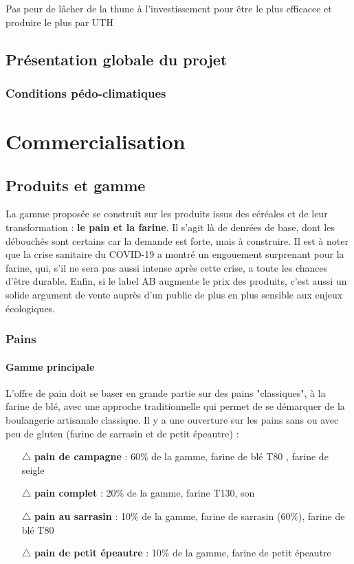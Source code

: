 \documentclass{book}
\begin{document}
Pas peur de lâcher de la thune à l'investissement pour être le plus efficacee et produire le plus par UTH

\section{Présentation globale du projet}

\subsection{Conditions pédo-climatiques}

\chapter{Commercialisation}

\section{Produits et gamme}

La gamme proposée se construit sur les produits issus des céréales et de leur transformation : \textbf{le pain et la farine}. Il s'agit là de denrées de base, dont les débouchés sont certains car la demande est forte, mais à construire. Il est à noter que la crise sanitaire du COVID-19 a montré un engouement surprenant pour la farine, qui, s'il ne sera pas aussi intense après cette crise, a toute les chances d'être durable. Enfin, si le label AB augmente le prix des produits, c'est aussi un solide argument de vente auprès d'un public de plus en plus sensible aux enjeux écologiques. 

\subsection{Pains}
\label{part:pains}

\subsubsection{Gamme principale}

L'offre de pain doit se baser en grande partie sur des pains "classiques", à la farine de blé, avec une approche traditionnelle qui permet de se démarquer de la boulangerie artisanale classique. Il y a une ouverture sur les pains sans ou avec peu de gluten (farine de sarrasin et de petit épeautre) :

\begin{itemize}

	\item[$\triangle$] \textbf{pain de campagne} : 60\% de la gamme, farine de blé T80 , farine de seigle
	\item[$\triangle$] \textbf{pain complet} : 20\% de la gamme, farine T130, son
	\item[$\triangle$] \textbf{pain au sarrasin} : 10\% de la gamme, farine de sarrasin (60\%), farine de blé T80
	\item[$\triangle$] \textbf{pain de petit épeautre} : 10\% de la gamme, farine de petit épeautre

\end{itemize}
\end{document}
